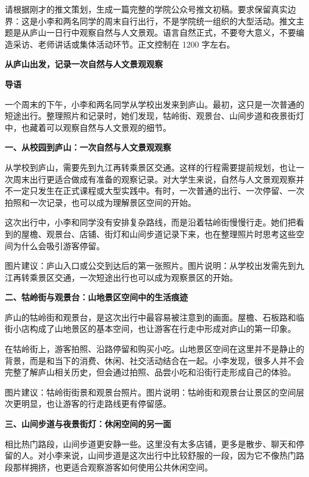 \begin{userbox}
请根据刚才的推文策划，生成一篇完整的学院公众号推文初稿。要求保留真实边界：这是小李和两名同学的周末自行出行，不是学院统一组织的大型活动。推文主题是从庐山一日行中观察自然与人文景观。语言自然正式，不要夸大意义，不要编造采访、老师讲话或集体活动环节。正文控制在 1200 字左右。
\end{userbox}

\begin{aibox}
\textbf{从庐山出发，记录一次自然与人文景观观察}

\textbf{导语}

一个周末的下午，小李和两名同学从学校出发来到庐山。最初，这只是一次普通的短途出行。整理照片和记录时，她们发现，牯岭街、观景台、山间步道和夜景街灯中，也藏着可以观察自然与人文景观的细节。

\textbf{一、从校园到庐山：一次自然与人文景观观察}

从学校到庐山，需要先到九江再转乘景区交通。这样的行程需要提前规划，也让一次周末出行更适合做成有准备的观察记录。对大学生来说，自然与人文景观观察并不一定只发生在正式课程或大型实践中。有时，一次普通的出行、一次停留、一次拍照和一次记录，也可以成为理解景区空间的开始。

这次出行中，小李和同学没有安排复杂路线，而是沿着牯岭街慢慢行走。她们把看到的屋檐、观景台、店铺、街灯和山间步道记录下来，也在整理照片时思考这些空间为什么会吸引游客停留。

图片建议：庐山入口或公交到达后的第一张照片。图片说明：从学校出发需先到九江再转乘景区交通，一次短途出行也可以成为观察景区的开始。

\textbf{二、牯岭街与观景台：山地景区空间中的生活痕迹}

庐山的牯岭街和观景台，是这次出行中最容易被注意到的画面。屋檐、石板路和临街小店构成了山地景区的基本空间，也让游客在行走中形成对庐山的第一印象。

在牯岭街上，游客拍照、沿路停留和购买小吃。山地景区空间在这里并不是静止的背景，而是和当下的消费、休闲、社交活动结合在一起。小李发现，很多人并不会完整了解庐山相关历史，但会通过拍照、品尝小吃和沿街行走形成自己的体验。

图片建议：牯岭街街景和观景台照片。图片说明：牯岭街和观景台让景区的空间层次更明显，也让游客的行走路线更有停留感。

\textbf{三、山间步道与夜景街灯：休闲空间的另一面}

相比热门路段，山间步道更安静一些。这里没有太多店铺，更多是散步、聊天和停留的人。对小李来说，山间步道是这次出行中比较舒服的一段，因为它不像热门路段那样拥挤，也更适合观察游客如何使用公共休闲空间。


\end{aibox}
